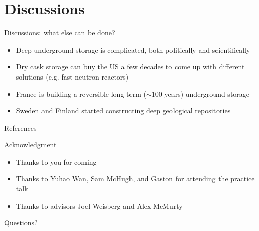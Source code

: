 \documentclass[10pt]{beamer}
\begin{document}
\section{Discussions}

\begin{frame}{Discussions: what else can be done?}
\begin{itemize}[<+->]
\item Deep underground storage is complicated, both politically and scientifically
\item Dry cask storage can buy the US a few decades to come up with different solutions (e.g. fast neutron reactors)
\item France is building a reversible long-term ($\sim 100$ years) underground storage
\item Sweden and Finland started constructing deep geological repositories
\end{itemize}

\end{frame}

\begin{frame}[allowframebreaks]{References}
  

\end{frame}

\begin{frame}{Acknowledgment}
\begin{itemize}
\item Thanks to you for coming
\item Thanks to Yuhao Wan, Sam McHugh, and Gaston for attending the practice talk
\item Thanks to advisors Joel Weisberg and Alex McMurty
\end{itemize}
\end{frame}

\begin{frame}[standout]
Questions?
\end{frame}
\end{document}
